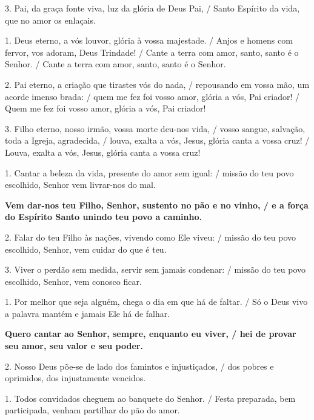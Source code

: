 \documentclass[a5paper,9pt]{extarticle}
\begin{document}
\begin{cantos}
\begin{canto}
3. Pai, da graça fonte viva, luz da glória de Deus Pai, / Santo Espírito da vida, que no amor os enlaçais.
\end{canto}

\begin{canto}
1. Deus eterno, a vós louvor, glória à vossa majestade. / Anjos e homens com fervor, vos adoram, Deus Trindade! / Cante a terra com amor, santo, santo é o Senhor. / Cante a terra com amor, santo, santo é o Senhor.

2. Pai eterno, a criação que tirastes vós do nada, / repousando em vossa mão, um acorde imenso brada: / quem me fez foi vosso amor, glória a vós, Pai criador! / Quem me fez foi vosso amor, glória a vós, Pai criador!

3. Filho eterno, nosso irmão, vossa morte deu-nos vida, / vosso sangue, salvação, toda a Igreja, agradecida, / louva, exalta a vós, Jesus, glória canta a vossa cruz! / Louva, exalta a vós, Jesus, glória canta a vossa cruz!
\end{canto}

\begin{canto}
1. Cantar a beleza da vida, presente do amor sem igual: / missão do teu povo escolhido, Senhor vem livrar-nos do mal.

\textbf{Vem dar-nos teu Filho, Senhor, sustento no pão e no vinho, / e a força do Espírito Santo unindo teu povo a caminho.}

2. Falar do teu Filho às nações, vivendo como Ele viveu: / missão do teu povo escolhido, Senhor, vem cuidar do que é teu.

3. Viver o perdão sem medida, servir sem jamais condenar: / missão do teu povo escolhido, Senhor, vem conosco ficar.
\end{canto}

\begin{canto}
1. Por melhor que seja alguém, chega o dia em que há de faltar. / Só o Deus vivo a palavra mantém e jamais Ele há de falhar.

\textbf{Quero cantar ao Senhor, sempre, enquanto eu viver, / hei de provar seu amor, seu valor e seu poder.}

2. Nosso Deus põe-se de lado dos famintos e injustiçados, / dos pobres e oprimidos, dos injustamente vencidos.
\end{canto}

\begin{canto}
1. Todos convidados cheguem ao banquete do Senhor. / Festa preparada, bem participada, venham partilhar do pão do amor.


\end{canto}
\end{cantos}
\end{document}
